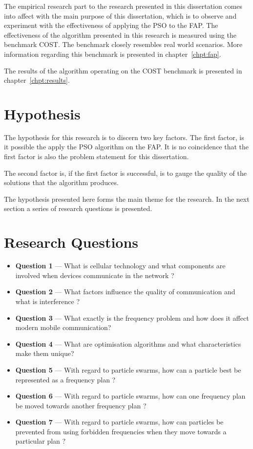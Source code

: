 The empirical research part to the research presented in this dissertation comes into affect with the main purpose of this dissertation, which is to observe and experiment with the effectiveness of applying the \gls{PSO} to the \gls{FAP}. The effectiveness of the algorithm presented in this research is measured using the benchmark \gls{COST}. The benchmark closely resembles real world scenarios. More information regarding this benchmark is presented in chapter~\ref{chpt:fap}.

The results of the algorithm operating on the \gls{COST} benchmark is presented in chapter~\ref{chpt:results}. 
\section{Hypothesis}
The hypothesis for this research is to discern two key factors. The first factor, is it possible the apply the \gls{PSO} algorithm on the \gls{FAP}. It is no coincidence that the first factor is also the problem statement for this dissertation.

The second factor is, if the first factor is successful, is to gauge the quality of the solutions that the algorithm produces.

The hypothesis presented here forms the main theme for the research. In the next section a series of research questions is presented.
\section{Research Questions}
\begin{itemize}
\item \textbf{Question 1} --- What is cellular technology and what components are involved when devices communicate in the network ?
\item \textbf{Question 2} --- What factors influence the quality of communication and what is interference ?
\item \textbf{Question 3} --- What exactly is the frequency problem and how does it affect modern mobile communication?
\item \textbf{Question 4} --- What are optimisation algorithms and what characteristics make them unique?
\item \textbf{Question 5} --- With regard to particle swarms, how can a particle best be represented as a frequency plan ?
\item \textbf{Question 6} --- With regard to particle swarms, how can one frequency plan be moved towards another frequency plan ?
\item \textbf{Question 7} --- With regard to particle swarms, how can particles be prevented from using forbidden frequencies when they move towards a particular plan ?
\end{itemize}

